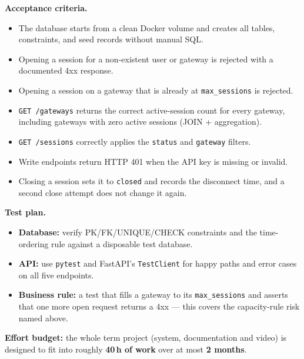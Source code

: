 \documentclass[11pt,a4paper]{article}
\begin{document}
\textbf{Acceptance criteria.}
\begin{itemize}[topsep=2pt]
  \item The database starts from a clean Docker volume and creates all tables,
        constraints, and seed records without manual SQL.
  \item Opening a session for a non-existent user or gateway is rejected with a
        documented 4xx response.
  \item Opening a session on a gateway that is already at \texttt{max\_sessions}
        is rejected.
  \item \texttt{GET /gateways} returns the correct active-session count for
        every gateway, including gateways with zero active sessions (JOIN +
        aggregation).
  \item \texttt{GET /sessions} correctly applies the \texttt{status} and
        \texttt{gateway} filters.
  \item Write endpoints return HTTP 401 when the API key is missing or invalid.
  \item Closing a session sets it to \texttt{closed} and records the disconnect
        time, and a second close attempt does not change it again.
\end{itemize}

\textbf{Test plan.}
\begin{itemize}[topsep=2pt]
  \item \textbf{Database:} verify PK/FK/UNIQUE/CHECK constraints and the
        time-ordering rule against a disposable test database.
  \item \textbf{API:} use \texttt{pytest} and FastAPI's \texttt{TestClient}
        for happy paths and error cases on all five endpoints.
  \item \textbf{Business rule:} a test that fills a gateway to its
        \texttt{max\_sessions} and asserts that one more open request returns a
        4xx --- this covers the capacity-rule risk named above.
\end{itemize}

\vspace{1em}
\begin{infobox}
\textbf{Effort budget:} the whole term project (system, documentation and video)
is designed to fit into roughly \textbf{40\,h of work} over at most
\textbf{2 months}.
\end{infobox}
\end{document}
